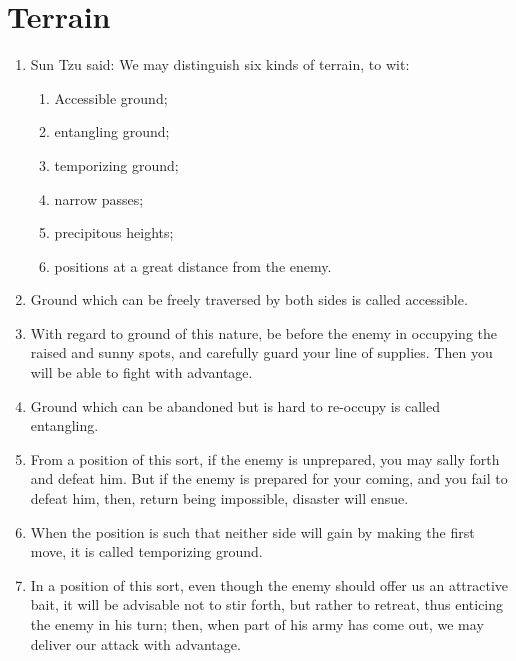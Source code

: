 \addtocounter{chapter}{1}\chapter*{Terrain}
\begin{enumerate}
  
\item Sun Tzu said:  We may distinguish six kinds of terrain,
    to wit:
    \begin{enumerate}
    \item Accessible ground; \item entangling ground;
    \item temporizing ground; \item narrow passes; \item precipitous
      heights; \item positions at a great distance from the enemy.
    \end{enumerate}
  \item Ground which can be freely traversed by both sides is called
    accessible.

  \item With regard to ground of this nature, be before the enemy in
    occupying the raised and sunny spots, and carefully guard your
    line of supplies. Then you will be able to fight with advantage.

  \item Ground which can be abandoned but is hard to re-occupy is
    called entangling.

  \item From a position of this sort, if the enemy is unprepared, you
    may sally forth and defeat him. But if the enemy is prepared for
    your coming, and you fail to defeat him, then, return being
    impossible, disaster will ensue.

  \item When the position is such that neither side will gain by
    making the first move, it is called temporizing ground.

  \item In a position of this sort, even though the enemy should offer
    us an attractive bait, it will be advisable not to stir forth, but
    rather to retreat, thus enticing the enemy in his turn; then, when
    part of his army has come out, we may deliver our attack with
    advantage.


\end{enumerate}
